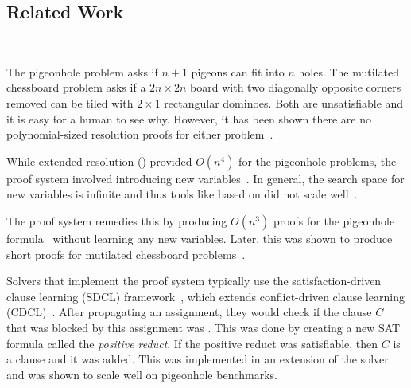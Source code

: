 



\subsection{Related Work}~\label{subsec:relatedwork}

The pigeonhole problem asks if $n+1$ pigeons can fit into $n$ holes. The
mutilated chessboard problem asks if a $2n \times 2n$ board with two diagonally
opposite corners removed can be tiled with $2 \times 1$ rectangular dominoes.
Both are unsatisfiable and it is easy for a human to see why. However, it has
been shown there are no polynomial-sized resolution proofs for either
problem~\cite{hakenpigeonhole,mutilatedchessboard-exponential}.




 While extended resolution (\er) provided $O(n^4)$ for the pigeonhole problems, the proof system involved introducing new variables~\cite{er}. In general, the search space for new variables is infinite and thus tools like \glucoser based on \er did not scale well~\cite{glucoser}.

The \pr proof system remedies this by producing $O(n^3)$ proofs for the pigeonhole formula~\cite{prclauses} without learning any new variables. Later, this was shown to produce short proofs for mutilated chessboard problems~\cite{mutilatedchessboard-pr}. 

Solvers that implement the \pr proof system typically use the satisfaction-driven clause learning (SDCL) framework~\cite{sdcl}, which extends conflict-driven clause learning (CDCL)~\cite{cdcl}. 
After propagating an assignment, they would check if the clause $C$ that was blocked by this assignment was \pr. This was done by creating a new SAT formula called the \emph{positive reduct}. If the positive reduct was satisfiable, then $C$ is a \pr clause and it was added. This was implemented in an extension of the solver \lingeling and was shown to scale well on pigeonhole benchmarks.

